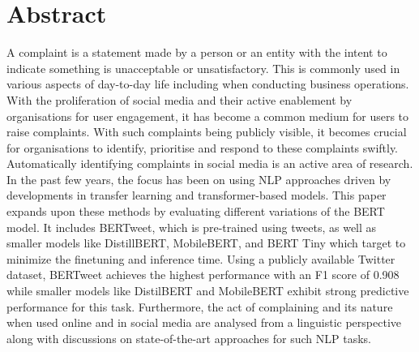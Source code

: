\chapter*{\Large \center Abstract}

A complaint is a statement made by a person or an entity with the intent to indicate something is unacceptable or unsatisfactory. This is commonly used in various aspects of day-to-day life including when conducting business operations. With the proliferation of social media and their active enablement by organisations for user engagement, it has become a common medium for users to raise complaints. With such complaints being publicly visible, it becomes crucial for organisations to identify, prioritise and respond to these complaints swiftly. Automatically identifying complaints in social media is an active area of research. In the past few years, the focus has been on using NLP approaches driven by developments in transfer learning and transformer-based models.
\newline \newline
This paper expands upon these methods by evaluating different variations of the BERT model. It includes BERTweet, which is pre-trained using tweets, as well as smaller models like DistillBERT, MobileBERT, and BERT Tiny which target to minimize the finetuning and inference time. Using a publicly available Twitter dataset, BERTweet achieves the highest performance with an F1 score of 0.908 while smaller models like DistilBERT and MobileBERT exhibit strong predictive performance for this task. Furthermore, the act of complaining and its nature when used online and in social media are analysed from a linguistic perspective along with discussions on state-of-the-art approaches for such NLP tasks.
\newline \newline
